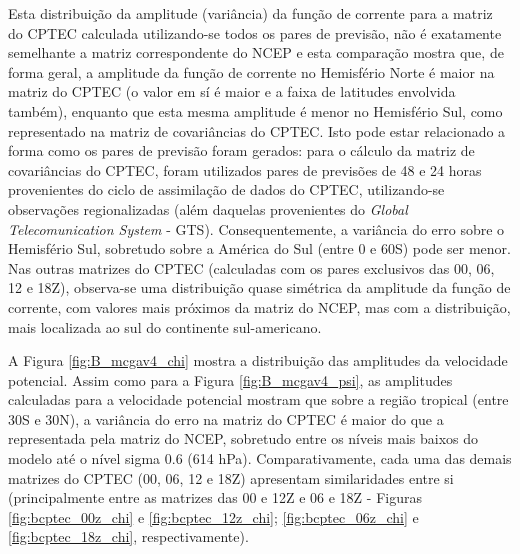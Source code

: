 Esta distribuição da amplitude (variância) da função de corrente para a matriz do CPTEC calculada utilizando-se todos os pares de previsão, não é exatamente semelhante a matriz correspondente do NCEP e esta comparação mostra que, de forma geral, a amplitude da função de corrente no Hemisfério Norte é maior na matriz do CPTEC (o valor em sí é maior e a faixa de latitudes envolvida também), enquanto que esta mesma amplitude é menor no Hemisfério Sul, como representado na matriz de covariâncias do CPTEC. Isto pode estar relacionado a forma como os pares de previsão foram gerados: para o cálculo da matriz de covariâncias do CPTEC, foram utilizados pares de previsões de 48 e 24 horas provenientes do ciclo de assimilação de dados do CPTEC, utilizando-se observações regionalizadas (além daquelas provenientes do \textit{Global Telecomunication System} - GTS). Consequentemente, a variância do erro sobre o Hemisfério Sul, sobretudo sobre a América do Sul (entre 0 e 60S) pode ser menor. Nas outras matrizes do CPTEC (calculadas com os pares exclusivos das 00, 06, 12 e 18Z), observa-se uma distribuição quase simétrica da amplitude da função de corrente, com valores mais próximos da matriz do NCEP, mas com a distribuição, mais localizada ao sul do continente sul-americano.

A Figura \ref{fig:B_mcgav4_chi} mostra a distribuição das amplitudes da velocidade potencial. Assim como para a Figura \ref{fig:B_mcgav4_psi}, as amplitudes calculadas para a velocidade potencial mostram que sobre a região tropical (entre 30S e 30N), a variância do erro na matriz do CPTEC é maior do que a representada pela matriz do NCEP, sobretudo entre os níveis mais baixos do modelo até o nível sigma 0.6 (614 hPa). Comparativamente, cada uma das demais matrizes do CPTEC (00, 06, 12 e 18Z) apresentam similaridades entre si (principalmente entre as matrizes das 00 e 12Z e 06 e 18Z - Figuras \ref{fig:bcptec_00z_chi} e \ref{fig:bcptec_12z_chi}; \ref{fig:bcptec_06z_chi} e \ref{fig:bcptec_18z_chi}, respectivamente).

